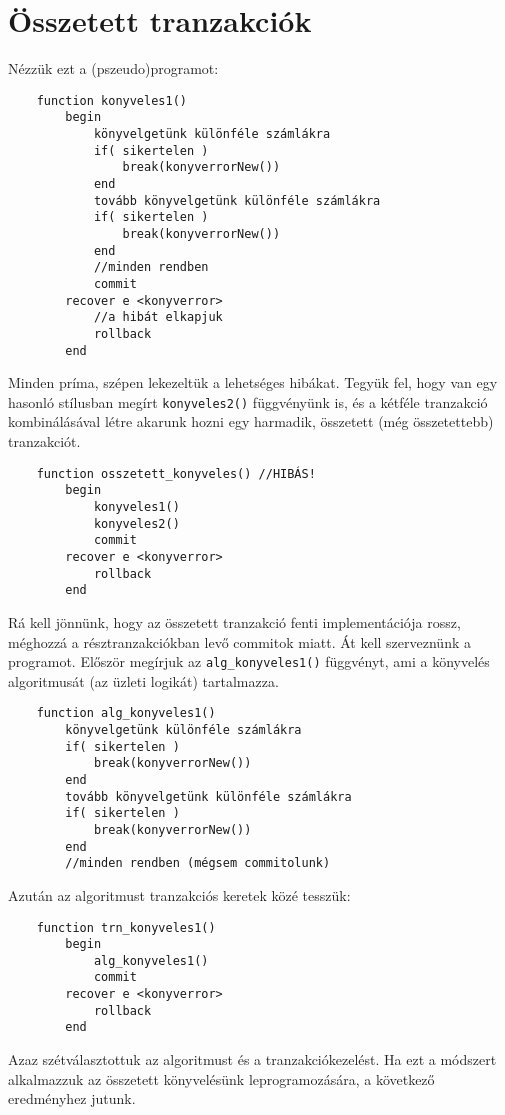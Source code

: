 
\section{Összetett tranzakciók}

Nézzük ezt a (pszeudo)programot:

\begin{verbatim}
    function konyveles1()
        begin
            könyvelgetünk különféle számlákra
            if( sikertelen ) 
                break(konyverrorNew())
            end
            tovább könyvelgetünk különféle számlákra
            if( sikertelen ) 
                break(konyverrorNew())
            end
            //minden rendben
            commit
        recover e <konyverror>
            //a hibát elkapjuk
            rollback
        end
\end{verbatim}
Minden príma, szépen lekezeltük a lehetséges hibákat.
Tegyük fel, hogy van egy hasonló stílusban megírt 
\verb!konyveles2()! függvényünk is, és a kétféle tranzakció
kombinálásával létre akarunk hozni egy harmadik, összetett 
(még összetettebb) tranzakciót.
\begin{verbatim}
    function osszetett_konyveles() //HIBÁS!
        begin
            konyveles1()
            konyveles2()
            commit
        recover e <konyverror>
            rollback
        end
\end{verbatim}
Rá kell jönnünk, hogy az összetett tranzakció fenti implementációja
rossz, méghozzá a résztranzakciókban levő commitok miatt.
Át kell szerveznünk a programot. Először megírjuk az 
\verb!alg_konyveles1()! függvényt, ami a könyvelés algoritmusát
(az üzleti logikát) tartalmazza.
\begin{verbatim}
    function alg_konyveles1()
        könyvelgetünk különféle számlákra
        if( sikertelen ) 
            break(konyverrorNew())
        end
        tovább könyvelgetünk különféle számlákra
        if( sikertelen ) 
            break(konyverrorNew())
        end
        //minden rendben (mégsem commitolunk)
\end{verbatim}
Azután az algoritmust tranzakciós keretek közé tesszük:
\begin{verbatim}
    function trn_konyveles1()
        begin
            alg_konyveles1()
            commit
        recover e <konyverror>
            rollback
        end
\end{verbatim}
Azaz szétválasztottuk az algoritmust és a tranzakciókezelést.
Ha ezt a módszert alkalmazzuk az összetett könyvelésünk
leprogramozására, a következő eredményhez jutunk.
